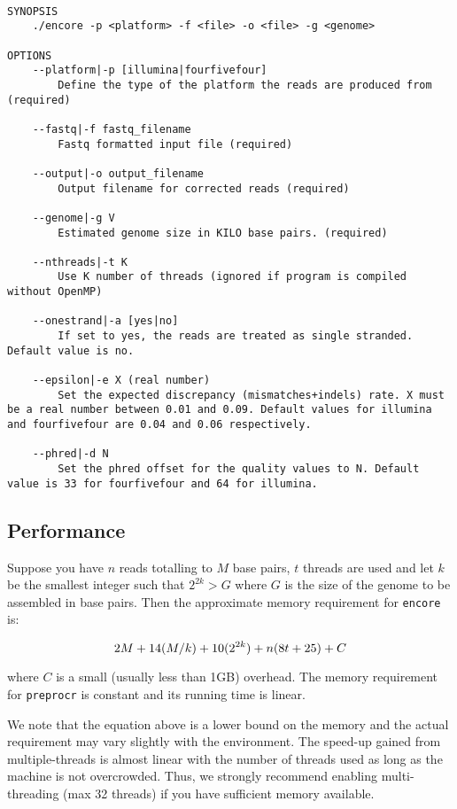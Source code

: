 \documentclass[12pt,a4paper]{report}
\begin{document}
\begin{lstlisting}

SYNOPSIS
    ./encore -p <platform> -f <file> -o <file> -g <genome> 

OPTIONS 
    --platform|-p [illumina|fourfivefour] 
        Define the type of the platform the reads are produced from (required) 

    --fastq|-f fastq_filename 
        Fastq formatted input file (required) 

    --output|-o output_filename 
        Output filename for corrected reads (required) 

    --genome|-g V 
        Estimated genome size in KILO base pairs. (required) 

    --nthreads|-t K 
        Use K number of threads (ignored if program is compiled without OpenMP)

    --onestrand|-a [yes|no] 
        If set to yes, the reads are treated as single stranded. Default value is no. 

    --epsilon|-e X (real number) 
        Set the expected discrepancy (mismatches+indels) rate. X must be a real number between 0.01 and 0.09. Default values for illumina and fourfivefour are 0.04 and 0.06 respectively. 

    --phred|-d N 
        Set the phred offset for the quality values to N. Default value is 33 for fourfivefour and 64 for illumina. 

\end{lstlisting}

\subsection{Performance}

Suppose you have $n$ reads totalling to $M$ base pairs, $t$ threads are used and let $k$ be the smallest integer such that $2^{2k}>G$ where $G$ is the size of the genome to be assembled in base pairs. Then the approximate memory requirement for \texttt{encore} is:

\begin{equation}
2M + 14(M/k) + 10(2^{2k}) + n(8t + 25) + C \\
\end{equation}

where $C$ is a small (usually less than 1GB) overhead. The memory requirement for \texttt{preprocr} is constant and its running time is linear.

We note that the equation above is a lower bound on the memory and the actual requirement may vary slightly with the environment. The speed-up gained from multiple-threads is almost linear with the number of threads used as long as the machine is not overcrowded. Thus, we strongly recommend enabling multi-threading (max 32 threads) if you have sufficient memory available. 
\end{document}
